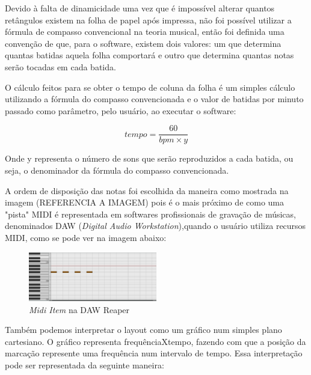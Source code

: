 \documentclass[12pt]{report}
\begin{document}
{Devido à falta de dinamicidade uma vez que é impossível alterar quantos retângulos existem na folha de papel após impressa, não foi possível utilizar a fórmula de compasso convencional na teoria musical, então foi definida uma convenção de que, para o software, existem dois valores: um que determina quantas batidas aquela folha comportará e outro que determina quantas notas serão tocadas em cada batida.

O cálculo feitos para se obter o tempo de coluna da folha é um simples cálculo utilizando a fórmula do compasso convencionada e o valor de batidas por minuto passado como parâmetro, pelo usuário, ao executar o software:

\begin{equation}
tempo = \dfrac{60}{bpm \times y}
\end{equation}

Onde y representa o número de sons que serão reproduzidos a cada batida, ou seja, o denominador da fórmula do compasso convencionada.

A ordem de disposição das notas foi escolhida da maneira como mostrada na imagem (REFERENCIA A IMAGEM) pois é o mais próximo de como uma "pista" MIDI é representada em softwares profissionais de gravação de músicas, denominados DAW ({\it Digital Audio Workstation}),quando o usuário utiliza recursos MIDI, como se pode ver na imagem abaixo:

\begin{figure}[H]
  \centering
    \includegraphics[width=0.5\textwidth]{imagens/midi_item_reaper.png}
    \caption{{\it Midi Item} na DAW Reaper}
  \label{fig:reaper}
\end{figure}

Também podemos interpretar o layout como um gráfico num simples plano cartesiano. O gráfico representa frequênciaXtempo, fazendo com que a posição da marcação represente uma frequência num intervalo de tempo. Essa interpretação pode ser representada da seguinte maneira:

}
\end{document}
